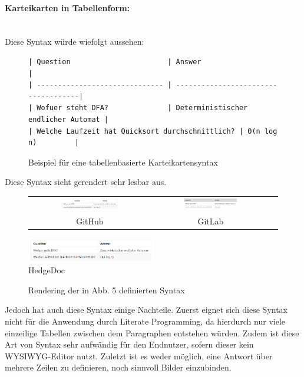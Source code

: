 \documentclass[ngerman]{article}
\begin{document}
\paragraph{Karteikarten in Tabellenform:}~\\
Diese Syntax würde wiefolgt aussehen:
\begin{figure}[H]
  \begin{lstlisting}
| Question                       | Answer                              |
| ------------------------------ | ------------------------------------|
| Wofuer steht DFA?              | Deterministischer endlicher Automat |
| Welche Laufzeit hat Quicksort durchschnittlich? | O(n log n)         |
\end{lstlisting}
  \caption{Beispiel für eine tabellenbasierte Karteikartensyntax}
\end{figure}

Diese Syntax sieht gerendert sehr lesbar aus.

\begin{figure}[H]
\centering
\begin{tabular}{ccc}
  \includegraphics[width=0.5\textwidth]{./figures/GH_Syntax3} &
  \includegraphics[width=0.5\textwidth]{./figures/GL_Syntax3}\\
GitHub & GitLab\\
\end{tabular}
  \includegraphics[width=0.5\textwidth]{./figures/HD_Syntax3} \\
  HedgeDoc
\caption{Rendering der in Abb. 5 definierten Syntax}
\end{figure}

Jedoch hat auch diese Syntax einige Nachteile. Zuerst eignet sich diese Syntax nicht für die Anwendung durch Literate Programming, da hierdurch nur viele einzeilige Tabellen zwischen dem Paragraphen entstehen würden. Zudem ist diese Art von Syntax sehr aufwändig für den Endnutzer, sofern dieser kein WYSIWYG-Editor nutzt. Zuletzt ist es weder möglich, eine Antwort über mehrere Zeilen zu definieren, noch sinnvoll Bilder einzubinden.
\end{document}
